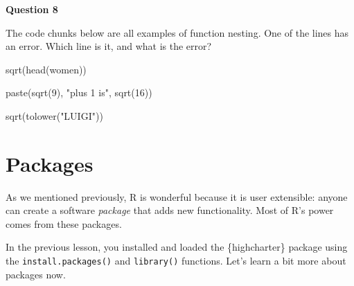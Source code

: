 \documentclass[
  letterpaper,
  DIV=11,
  numbers=noendperiod]{scrreprt}
\newenvironment{Shaded}{\begin{snugshade}}{\end{snugshade}}
\newcommand{\DecValTok}[1]{\textcolor[rgb]{0.68,0.00,0.00}{#1}}
\newcommand{\FunctionTok}[1]{\textcolor[rgb]{0.28,0.35,0.67}{#1}}
\newcommand{\NormalTok}[1]{\textcolor[rgb]{0.00,0.23,0.31}{#1}}
\newcommand{\StringTok}[1]{\textcolor[rgb]{0.13,0.47,0.30}{#1}}
\begin{document}
\begin{tcolorbox}[enhanced jigsaw, colframe=quarto-callout-tip-color-frame, rightrule=.15mm, opacityback=0, breakable, coltitle=black, colbacktitle=quarto-callout-tip-color!10!white, bottomrule=.15mm, leftrule=.75mm, toprule=.15mm, arc=.35mm, bottomtitle=1mm, colback=white, left=2mm, opacitybacktitle=0.6, titlerule=0mm, title=\textcolor{quarto-callout-tip-color}{\faLightbulb}\hspace{0.5em}{Practice}, toptitle=1mm]

\textbf{Question 8}

The code chunks below are all examples of function nesting. One of the
lines has an error. Which line is it, and what is the error?

\begin{Shaded}
\begin{Highlighting}[]
\FunctionTok{sqrt}\NormalTok{(}\FunctionTok{head}\NormalTok{(women))}
\end{Highlighting}
\end{Shaded}

\begin{Shaded}
\begin{Highlighting}[]
\FunctionTok{paste}\NormalTok{(}\FunctionTok{sqrt}\NormalTok{(}\DecValTok{9}\NormalTok{), }\StringTok{"plus 1 is"}\NormalTok{, }\FunctionTok{sqrt}\NormalTok{(}\DecValTok{16}\NormalTok{))}
\end{Highlighting}
\end{Shaded}

\begin{Shaded}
\begin{Highlighting}[]
\FunctionTok{sqrt}\NormalTok{(}\FunctionTok{tolower}\NormalTok{(}\StringTok{"LUIGI"}\NormalTok{))}
\end{Highlighting}
\end{Shaded}

\end{tcolorbox}

\hypertarget{packages-1}{%
\section{Packages}\label{packages-1}}

As we mentioned previously, R is wonderful because it is user
extensible: anyone can create a software \emph{package} that adds new
functionality. Most of R's power comes from these packages.

In the previous lesson, you installed and loaded the \{highcharter\}
package using the \texttt{install.packages()} and \texttt{library()}
functions. Let's learn a bit more about packages now.
\end{document}
